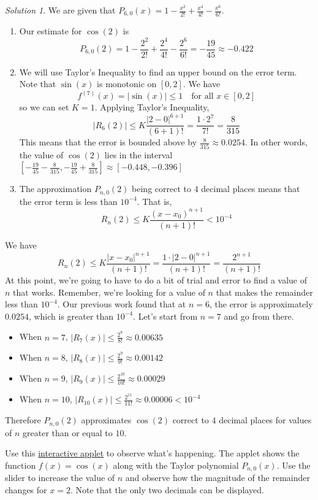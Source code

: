 \documentclass[
]{book}
\providecommand{\tightlist}{%
  \setlength{\itemsep}{0pt}\setlength{\parskip}{0pt}}
\theoremstyle{definition}
\theoremstyle{definition}
\theoremstyle{definition}
\theoremstyle{definition}
\theoremstyle{remark}
\newtheorem*{solution}{Solution}
\begin{document}
\begin{solution}

We are given that \(P_{6,0}(x)=1- \frac{x^2}{2!}+\frac{x^4}{4!}-\frac{x^6}{6!}\).

\begin{enumerate}
\def\labelenumi{\alph{enumi}.}
\tightlist
\item
  Our estimate for \(\cos(2)\) is \[P_{6,0}(2)=1- \frac{2^2}{2!}+\frac{2^4}{4!}-\frac{2^6}{6!}=-\frac{19}{45}\approx -0.422\]
\item
  We will use Taylor's Inequality to find an upper bound on the error term. Note that \(\sin(x)\) is monotonic on \([0,2]\). We have \[f^{(7)}(x)=|\sin(x)|\leq 1\quad\mbox{for all $x\in[0,2]$}\] so we can set \(K=1\). Applying Taylor's Inequality, \[|R_6(2)|\leq K \frac{|2-0|^{6+1}}{(6+1)!}=\frac{1\cdot 2^7}{7!}=\frac{8}{315}\]
  This means that the error is bounded above by \(\frac{8}{315}\approx 0.0254\). In other words, the value of \(\cos(2)\) lies in the interval \([-\frac{19}{45}-\frac{8}{315}, -\frac{19}{45}+\frac{8}{315}]\approx [-0.448, -0.396]\)
\item
  The approximation \(P_{n,0}(2)\) being correct to \(4\) decimal places means that the error term is less than \(10^{-4}\). That is, \[R_{n}(2)\leq K \frac{(x-x_0)^{n+1}}{(n+1)!} < 10^{-4}\]
\end{enumerate}

We have \[R_{n}(2)\leq K \frac{|x-x_0|^{n+1}}{(n+1)!} = \frac{1\cdot |2-0|^{n+1}}{(n+1)!} = \frac{2^{n+1}}{(n+1)!}\]
At this point, we're going to have to do a bit of trial and error to find a value of \(n\) that works. Remember, we're looking for a value of \(n\) that makes the remainder less than \(10^{-4}\). Our previous work found that at \(n=6\), the error is approximately \(0.0254\), which is greater than \(10^{-4}\). Let's start from \(n=7\) and go from there.

\begin{itemize}
\tightlist
\item
  When \(n=7\), \(|R_7(x)|\leq \frac{2^8}{8!}\approx 0.00635\)
\item
  When \(n=8\), \(|R_8(x)|\leq \frac{2^9}{9!}\approx 0.00142\)
\item
  When \(n=9\), \(|R_9(x)|\leq \frac{2^{10}}{10!}\approx 0.00029\)
\item
  When \(n=10\), \(|R_{10}(x)|\leq \frac{2^{11}}{11!}\approx 0.00006 < 10^{-4}\)
\end{itemize}

Therefore \(P_{n,0}(2)\) approximates \(\cos(2)\) correct to \(4\) decimal places for values of \(n\) greater than or equal to \(10\).

Use this \href{https://www.geogebra.org/m/heswekn6}{interactive applet} to observe what's happening. The applet shows the function \(f(x)=\cos(x)\) along with the Taylor polynomial \(P_{n,0}(x)\). Use the slider to increase the value of \(n\) and observe how the magnitude of the remainder changes for \(x=2\). Note that the only two decimals can be displayed.

\end{solution}
\end{document}
